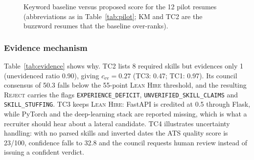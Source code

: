 \documentclass[conference]{IEEEtran}
\newcommand{\verd}[1]{\textsc{#1}}
\newcommand{\flag}[1]{\texttt{\footnotesize #1}}
\newcommand{\Slean}{\verd{Lean Hire}}
\newcommand{\Sreject}{\verd{Reject}}
\begin{document}
\begin{figure}[t]
\centering
{}
\caption{Keyword baseline versus proposed score for the 12 pilot resumes (abbreviations as in Table~\ref{tab:pilot}; KM and TC2 are the buzzword resumes that the baseline over-ranks).}
\label{fig:bars}
\end{figure}

\subsubsection{Evidence mechanism}
Table~\ref{tab:evidence} shows why. TC2 lists 8 required skills but evidences only 1 (unevidenced ratio 0.90), giving $c_{\mathrm{ev}}=0.27$ (TC3: 0.47; TC1: 0.97). Its council consensus of 50.3 falls below the 55-point \Slean{} threshold, and the resulting \Sreject{} carries the flags \flag{EXPERIENCE\_DEFICIT}, \flag{UNVERIFIED\_SKILL\_CLAIMS} and \flag{SKILL\_STUFFING}. TC3 keeps \Slean{}: FastAPI is credited at 0.5 through Flask, while PyTorch and the deep-learning stack are reported missing, which is what a recruiter should hear about a lateral candidate. TC4 illustrates uncertainty handling: with no parsed skills and inverted dates the ATS quality score is 23/100, confidence falls to 32.8 and the council requests human review instead of issuing a confident verdict.
\end{document}
